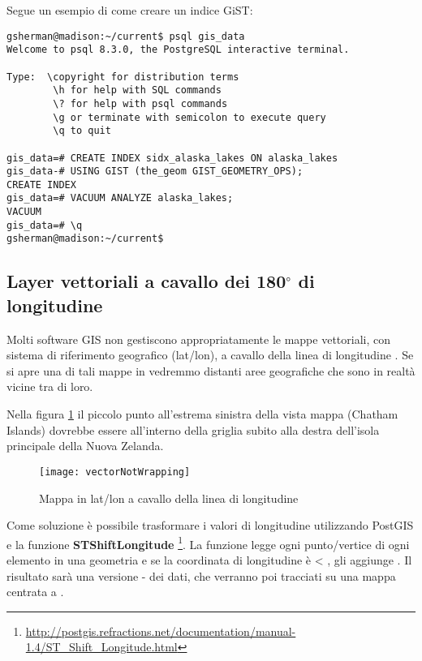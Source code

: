 Segue un esempio di come creare un indice GiST:
\begin{verbatim}
gsherman@madison:~/current$ psql gis_data
Welcome to psql 8.3.0, the PostgreSQL interactive terminal.

Type:  \copyright for distribution terms
        \h for help with SQL commands
        \? for help with psql commands
        \g or terminate with semicolon to execute query
        \q to quit

gis_data=# CREATE INDEX sidx_alaska_lakes ON alaska_lakes
gis_data-# USING GIST (the_geom GIST_GEOMETRY_OPS);
CREATE INDEX
gis_data=# VACUUM ANALYZE alaska_lakes;
VACUUM
gis_data=# \q
gsherman@madison:~/current$
\end{verbatim}

\subsection{Layer vettoriali a cavallo dei 180$^\circ$ di longitudine}

Molti software GIS non gestiscono appropriatamente le mappe vettoriali, con 
sistema di riferimento geografico (lat/lon), a cavallo della linea di longitudine . 
Se si apre una di tali mappe in \qg vedremmo distanti aree geografiche che sono in realtà 
vicine tra di loro.

Nella figura \ref{fig:vector_not_wrapping} il piccolo punto all'estrema sinistra 
della vista mappa (Chatham Islands) dovrebbe essere all'interno della griglia subito 
alla destra dell'isola principale della Nuova Zelanda.

\begin{figure}[ht]
   \centering
   \texttt{[image: vectorNotWrapping]}
      \caption{Mappa in lat/lon a cavallo della linea di longitudine  \nixcaption}
   \label{fig:vector_not_wrapping}
\end{figure}

Come soluzione è possibile trasformare i valori di longitudine utilizzando PostGIS 
e la funzione \textbf{ST\textunderscore Shift\textunderscore Longitude}
\footnote{\url{http://postgis.refractions.net/documentation/manual-1.4/ST\_Shift\_Longitude.html}}. 
La funzione legge ogni punto/vertice di ogni elemento in una geometria e se la coordinata di 
longitudine è < , gli aggiunge . 
Il risultato sarà una versione  -  dei dati, che verranno poi 
tracciati su una mappa centrata a .

